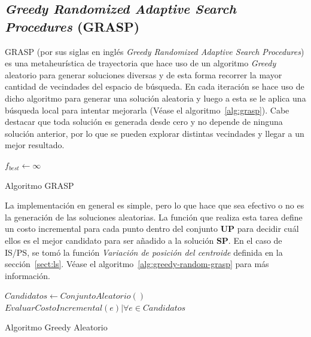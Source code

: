 \documentclass{ci5652}
\begin{document}
\subsection{\textit{\textbf{Greedy Randomized Adaptive Search Procedures}} (GRASP)}

GRASP (por sus siglas en inglés \textit{Greedy Randomized Adaptive Search Procedures}) es una metaheurística de trayectoria que hace uso de un algoritmo \textit{Greedy} aleatorio para generar soluciones diversas y de esta forma recorrer la mayor cantidad de vecindades del espacio de búsqueda. En cada iteración se hace uso de dicho algoritmo para generar una solución aleatoria y luego a esta se le aplica una búsqueda local para intentar mejorarla (Véase el algoritmo~\ref{alg:grasp}). Cabe destacar que toda solución es generada desde cero y no depende de ninguna solución anterior, por lo que se pueden explorar distintas vecindades y llegar a un mejor resultado.

\begin{algorithm}
    \DontPrintSemicolon
    \vspace*{0.1cm}

    $f_{best} \leftarrow \infty$\;
    \vspace*{0.1cm}
    \caption{Algoritmo GRASP}
    \label{alg:grasp}
\end{algorithm}
La implementación en general es simple, pero lo que hace que sea efectivo o no es la generación de las soluciones aleatorias. La función que realiza esta tarea define un costo incremental para cada punto dentro del conjunto \textbf{UP} para decidir cuál ellos es el mejor candidato para ser añadido a la solución \textbf{SP}. En el caso de IS/PS, se tomó la función \textit{Variación de posición del centroide} definida en la sección~\ref{sect:ls}. Véase el algoritmo~\ref{alg:greedy-random-grasp} para más información.


\begin{algorithm}
    \DontPrintSemicolon
    \vspace*{0.1cm}

    $Candidatos \leftarrow ConjuntoAleatorio()$\;
    $EvaluarCostoIncremental(e)|\forall e\in Candidatos$\;
    \vspace*{0.1cm}
    \caption{Algoritmo Greedy Aleatorio}
    \label{alg:greedy-random-grasp}
\end{algorithm}
\end{document}
